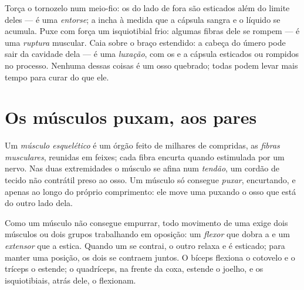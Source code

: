 \begin{example}\label{ex:g10:muscles-and-joints:injuries}
Torça o tornozelo num meio-fio: os  do lado de fora são
esticados além do limite deles --- é uma \emph{entorse}; a 
incha à medida que a cápsula sangra e o líquido se acumula. Puxe com
força um isquiotibial frio: algumas fibras dele se rompem --- é uma
\emph{ruptura} muscular. Caia sobre o braço estendido: a cabeça do
úmero pode sair da cavidade dela --- é uma \emph{luxação}, com os
 e a cápsula esticados ou rompidos no processo. Nenhuma
dessas coisas é um osso quebrado; todas podem levar mais tempo para
curar do que ele.
\end{example}

\section{Os músculos puxam, aos pares}

\begin{definition}\label{def:g10:muscles-and-joints:muscle}
Um \emph{músculo esquelético} é um órgão
feito de milhares de  compridas, as \emph{fibras musculares},
reunidas em feixes; cada fibra encurta quando estimulada por um nervo.
Nas duas extremidades o músculo se afina num
\emph{tendão}, um cordão de tecido não contrátil preso ao
osso. Um músculo só consegue \emph{puxar}, encurtando, e apenas ao
longo do próprio comprimento: ele move uma  puxando o osso
que está do outro lado dela.
\end{definition}

\begin{proposition}\label{prop:g10:muscles-and-joints:antagonists}
Como um músculo não consegue empurrar, todo movimento de uma
 exige dois músculos ou dois grupos trabalhando em oposição:
um \emph{flexor} que dobra a  e um \emph{extensor} que a
estica. Quando um se contrai, o outro relaxa e é esticado; para manter
uma posição, os dois se contraem juntos. O bíceps flexiona o cotovelo e
o tríceps o estende; o quadríceps, na frente da coxa, estende o joelho,
e os isquiotibiais, atrás dele, o flexionam.
\end{proposition}
\admitted

